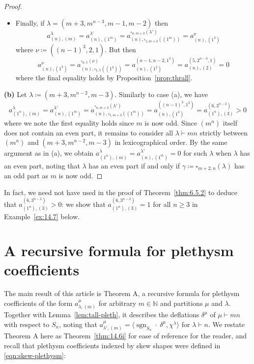 \documentclass[ALCO, Unicode]{cedram}
\newcommand{\sgn}{\operatorname{sgn}}
\newcommand{\N}{\mathbb{N}}
\begin{document}
\begin{proof}
\begin{itemize}
		\item Finally, if $\lambda=(m+3,m^{n-3},m-1,m-2)$ then
		\[ a^\lambda_{(n),(m)} = a^{\lambda'}_{(n),(1^m)} = a^{\square_{n,m+3}(\lambda')}_{(n),\square_{1,m+3}((1^m))} = a^{\nu}_{(n),(1^3)} \]
		where $\nu\coloneqq ((n-1)^3,2,1)$. But then
		\[ a^\nu_{(n),(1^3)} = a^{\square_{n,5}(\nu)}_{(n),\square_{1,5}((1^3))} = a^{(n-1,n-2,1^3)}_{(n),(1^2)} = a^{(5,2^{n-3},1)}_{(n),(2)}=0 \]
		where the final equality holds by Proposition~\ref{prop:thrall}.
	\end{itemize}
	
	\noindent\textbf{(b)} Let $\lambda\coloneqq (m+3,m^{n-2},m-3)$. Similarly to case (a), we have
	\[ a^\lambda_{(1^n),(m)} = a^{\lambda'}_{(n),(1^m)} = a^{\square_{n,m+3}(\lambda')}_{(n),\square_{1,m+3}((1^m))} = a^{((n-1)^3,1^3)}_{(n),(1^3)} = a^{(6,3^{n-2})}_{(1^n),(3)} >0 \]
	where we note the first equality holds since $m$ is now odd.	
	Since $(m^n)$ itself does not contain an even part, it remains to consider all $\lambda\vdash mn$ strictly between $(m^n)$ and $(m+3,m^{n-2},m-3)$ in lexicographical order. By the same argument as in (a), we obtain $a^\lambda_{(1^n),(m)}=a^{\lambda'}_{(n),(1^m)}=0$ for such $\lambda$ when $\lambda$ has an even part, noting that $\lambda$ has an even part if and only if $\gamma\coloneqq \square_{m+2,n}(\lambda)$ has an odd part as $m$ is now odd.
\end{proof}

\begin{remark}
	In fact, we need not have used \cite[Theorem 5.1.1]{dB-thesis} in the proof of Theorem~\ref{thm:6.5.2} to deduce that $a^{(6,3^{n-2})}_{(1^n),(3)}>0$: we show that $a^{(6,3^{n-2})}_{(1^n),(3)}=1$ for all $n\ge 3$ in Example~\ref{ex:14.7} below.%
\end{remark}



\section{A recursive formula for plethysm coefficients}\label{sec:14}
The main result of this article is Theorem A, a recursive formula for plethysm coefficients of the form $a^\mu_{\lambda,(m)}$ for arbitrary $m\in\N$ and partitions $\mu$ and $\lambda$. Together with Lemma~\ref{lem:tall-pleth}, it describes the deflations $\delta^\mu$ of $\mu\vdash mn$ with respect to $S_n$, noting that $a^\mu_{\lambda',(m)}=\langle \sgn_{S_n}\cdot\ \delta^\mu,\chi^\lambda\rangle$ for $\lambda\vdash n$. We restate Theorem A here as Theorem~\ref{thm:14.6i} for ease of reference for the reader, and recall that plethysm coefficients indexed by skew shapes were defined in \eqref{eqn:skew-plethysm}:
\end{document}
